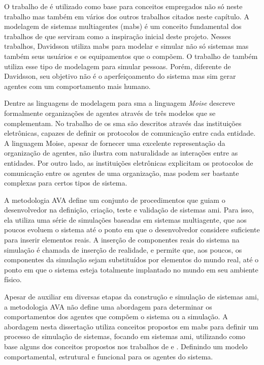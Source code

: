 O trabalho de  é utilizado como base para conceitos empregados não só neste trabalho mas também em vários dos outros trabalhos citados neste capítulo. A modelagem de sistemas multiagentes (\acrshort{mabs}) é um conceito fundamental dos trabalhos de  que serviram como a inspiração inicial deste projeto. Nesses trabalhos, Davidsson utiliza \acrshort{mabs} para modelar e simular não só sistemas mas também seus usuários e os equipamentos que o compõem. O trabalho de  também utiliza esse tipo de modelagem para simular pessoas. Porém, diferente de Davidsson, seu objetivo não é o aperfeiçoamento do sistema mas sim gerar agentes com um comportamento mais humano.

Dentre as linguagens de modelagem para \acrshort{sma} a linguagem \textit{Moise} \cite{hubner2002model, hubner2007developing} descreve formalmente organizações de agentes através de três modelos que se complementam. No trabalho de  os \acrshort{sma} são descritos através das instituições eletrônicas, capazes de definir os protocolos de comunicação entre cada entidade. A linguagem Moise, apesar de fornecer uma excelente representação da organização de agentes, não ilustra com naturalidade as interações entre as entidades. Por outro lado, as instituições eletrônicas explicitam os protocolos de comunicação entre os agentes de uma organização, mas podem ser bastante complexas para certos tipos de sistema. 

A metodologia AVA \cite{garcia2010human} define um conjunto de procedimentos que guiam o desenvolvedor na definição, criação, teste e validação de sistemas \acrshort{ami}. Para isso, ela utiliza uma série de simulações baseadas em sistemas multiagente, que aos poucos evoluem o sistema até o ponto em que o desenvolvedor considere suficiente para inserir elementos reais. A inserção de componentes reais do sistema na simulação é chamada de inserção de realidade, e permite que, aos poucos,  os componentes da simulação sejam substituídos por elementos do mundo real, até o ponto em que o sistema esteja totalmente implantado no mundo em seu ambiente físico.

Apesar de auxiliar em diversas etapas da construção e simulação de sistemas \acrshort{ami}, a metodologia AVA não define uma abordagem para determinar os comportamentos dos agentes que compõem o sistema ou a simulação. A abordagem nesta dissertação utiliza conceitos propostos em \acrshort{mabs} para definir um processo de simulação de sistemas, focando em sistemas \acrshort{ami}, utilizando como base alguns dos conceitos propostos nos trabalhos de  e . Definindo um modelo comportamental, estrutural e funcional para os agentes do sistema. 


